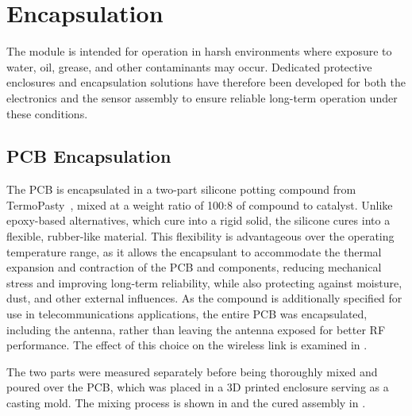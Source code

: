 \section{Encapsulation} \label{encapsulation}
The module is intended for operation in harsh environments where exposure to water, oil, grease, and other contaminants may occur. Dedicated protective enclosures and encapsulation solutions have therefore been developed for both the electronics and the sensor assembly to ensure reliable long-term operation under these conditions.

\subsection{PCB Encapsulation}
The PCB is encapsulated in a two-part silicone potting compound from TermoPasty~\cite{termopasty_silicone_compound_011}, mixed at a weight ratio of 100:8 of compound to catalyst. Unlike epoxy-based alternatives, which cure into a rigid solid, the silicone cures into a flexible, rubber-like material. This flexibility is advantageous over the operating temperature range, as it allows the encapsulant to accommodate the thermal expansion and contraction of the PCB and components, reducing mechanical stress and improving long-term reliability, while also protecting against moisture, dust, and other external influences. As the compound is additionally specified for use in telecommunications applications, the entire PCB was encapsulated, including the antenna, rather than leaving the antenna exposed for better RF performance. The effect of this choice on the wireless link is examined in .

The two parts were measured separately before being thoroughly mixed and poured over the PCB, which was placed in a 3D printed enclosure serving as a casting mold. The mixing process is shown in  and the cured assembly in .

